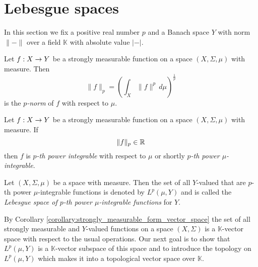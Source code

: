 \documentclass[10pt]{amsart}
\begin{document}
\section{Lebesgue spaces}\label{section:lebesgue_spaces}
\noindent
In this section we fix a positive real number $p$ and a Banach space $Y$ with norm $\lVert-\rVert$ over a field $\mathbb{K}$ with absolute value $|-|$.

\begin{definition}
	Let $f:X\rightarrow Y$ be a strongly measurable function on a space $(X,\Sigma,\mu)$ with measure. Then
	$$\lVert f\rVert_p = \left(\int_X\lVert f\rVert^p\,d\mu\right)^{\frac{1}{p}}$$
	is the \textit{$p$-norm} of $f$ with respect to $\mu$.
\end{definition}

\begin{definition}
	Let $f:X\rightarrow Y$ be a strongly measurable function on a space $(X,\Sigma,\mu)$ with measure. If
	$$\lVert f\rVert_p \in {\mathbb R}$$
then $f$ is \textit{$p$-th power integrable} with respect to $\mu$ or shortly \textit{$p$-th power $\mu$-integrable}.
\end{definition}

\begin{definition}
Let $(X,\Sigma,\mu)$ be a space with measure. Then the set of all $Y$-valued that are $p$-th power $\mu$-integrable functions is denoted by $L^p(\mu,Y)$ and is called the \textit{Lebesgue space of $p$-th power $\mu$-integrable functions} for $Y$.
\end{definition}
\noindent
By Corollary \ref{corollary:strongly_measurable_form_vector_space} the set of all strongly measurable and $Y$-valued functions on a space $(X,\Sigma)$ is a $\mathbb{K}$-vector space with respect to the usual operations. Our next goal is to show that $L^p(\mu,Y)$ is a $\mathbb{K}$-vector subspace of this space and to introduce the topology on $L^p(\mu,Y)$ which makes it into a topological vector space over $\mathbb{K}$.
\end{document}
